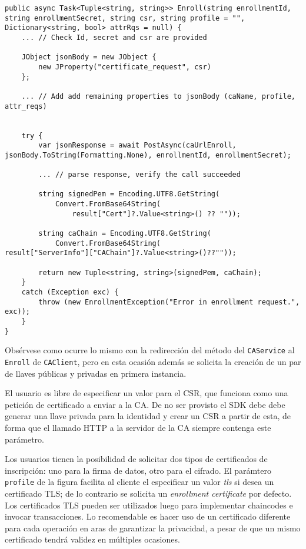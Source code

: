 \begin{lstlisting}[caption={M\'etodo \texttt{Enroll} de la clase \texttt{CAClient}.}, label={code:enrollClient}]
public async Task<Tuple<string, string>> Enroll(string enrollmentId, string enrollmentSecret, string csr, string profile = "", Dictionary<string, bool> attrRqs = null) {
	... // Check Id, secret and csr are provided
	
	JObject jsonBody = new JObject {
		new JProperty("certificate_request", csr)
	};
	
	... // Add add remaining properties to jsonBody (caName, profile, attr_reqs)
	

	try {
		var jsonResponse = await PostAsync(caUrlEnroll, 	jsonBody.ToString(Formatting.None), enrollmentId, enrollmentSecret);

		... // parse response, verify the call succeeded

		string signedPem = Encoding.UTF8.GetString(
			Convert.FromBase64String(
				result["Cert"]?.Value<string>() ?? ""));
		
		string caChain = Encoding.UTF8.GetString(
			Convert.FromBase64String(
result["ServerInfo"]["CAChain"]?.Value<string>()??""));

		return new Tuple<string, string>(signedPem, caChain);
	}
	catch (Exception exc) {
		throw (new EnrollmentException("Error in enrollment request.", exc));
	}
}
\end{lstlisting}

Obs\'ervese como ocurre lo mismo con la redirecci\'on del m\'etodo del \texttt{CAService} al \texttt{Enroll} de \texttt{CAClient}, pero en esta ocasi\'on adem\'as se solicita la creaci\'on de un par de llaves p\'ublicas y privadas en primera instancia.

El usuario es libre de especificar un valor para el CSR, que funciona como una petici\'on de certificado a enviar a la CA. De no ser provisto el SDK debe debe generar una llave privada para la identidad y crear un CSR a partir de esta, de forma que el llamado HTTP a la servidor de la CA siempre contenga este par\'ametro.

Los usuarios tienen la posibilidad de solicitar dos tipos de certificados de inscripción: uno para la firma de datos, otro para el cifrado. El par\'amtero \texttt{profile} de la figura facilita al cliente el especificar un valor \emph{tls} si desea un certificado TLS; de lo contrario se solicita un \emph{enrollment certificate} por defecto. Los certificados TLS pueden ser utilizados luego para implementar chaincodes e invocar transacciones. Lo recomendable es hacer uso de un certificado diferente para cada operaci\'on en aras de garantizar la privacidad, a pesar de que un mismo certificado tendr\'a validez en m\'ultiples ocasiones.

